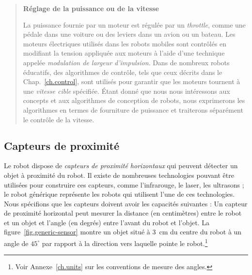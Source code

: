 {\begin{quote}
\begin{center}
\textbf{Réglage de la puissance ou de la vitesse}
\end{center}
La puissance fournie par un moteur est régulée par un \emph{throttle}, comme une pédale dans une voiture ou des leviers dans un avion ou un bateau. Les moteurs électriques utilisés dans les robots mobiles sont contrôlés en modifiant la tension appliquée aux moteurs à l'aide d'une technique appelée \emph{modulation de largeur d'impulsion}. Dans de nombreux robots éducatifs, des algorithmes de contrôle, tels que ceux décrits dans le Chap.~\ref{ch.control}, sont utilisés pour garantir que les moteurs tournent à une \emph{vitesse cible} spécifiée. Étant donné que nous nous intéressons aux concepts et aux algorithmes de conception de robots, nous exprimerons les algorithmes en termes de fourniture de puissance et traiterons séparément le contrôle de la vitesse.
\end{quote}

\subsection{Capteurs de proximité}

Le robot dispose de \emph{capteurs de proximité horizontaux} qui peuvent détecter un objet à proximité du robot. Il existe de nombreuses technologies pouvant être utilisées pour construire ces capteurs, comme l'infrarouge, le laser, les ultrasons ; le robot générique représente les robots qui utilisent l'une de ces technologies. Nous spécifions que les capteurs doivent avoir les capacités suivantes : Un capteur de proximité horizontal peut mesurer la distance (en centimètres) entre le robot et un objet et l'angle (en degrés) entre l'avant du robot et l'objet. La figure~\ref{fig.generic-sensor} montre un objet situé à $3\,$ cm du centre du robot à un angle de $45^{\circ}$ par rapport à la direction vers laquelle pointe le robot.\footnote{Voir Annexe~\ref{ch.units} sur les conventions de mesure des angles.}

}

